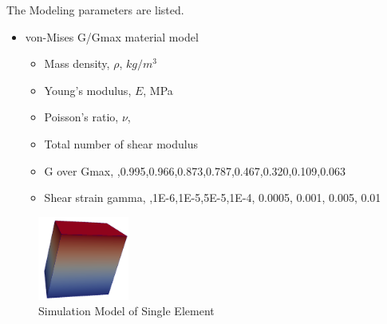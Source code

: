 The Modeling parameters are listed.
\begin{itemize}
  \item von-Mises G/Gmax material model 
  \begin{itemize}
    \item Mass density, $\rho$, \enspace {} $kg/m^3$
    \item Young's modulus, $E$, \enspace {} MPa
    \item Poisson's ratio, $\nu$, \enspace {}
    \item Total number of shear modulus \enspace {}
    \item G over Gmax, \enspace {},0.995,0.966,0.873,0.787,0.467,0.320,0.109,0.063
    \item Shear strain gamma, \enspace {},1E-6,1E-5,5E-5,1E-4, 0.0005, 0.001, 0.005, 0.01
  \end{itemize}
\end{itemize}


\begin{figure}[H]
  \centering
  \includegraphics[width = 3cm]{./Figure-files/Day3/Single_element_Models_illustrate_the_elastic-plastic_behavior/overview.png}
  \caption{Simulation Model of Single Element}
  \label{fig_single_element_elastic_plastic_vmGGmax}
\end{figure}



